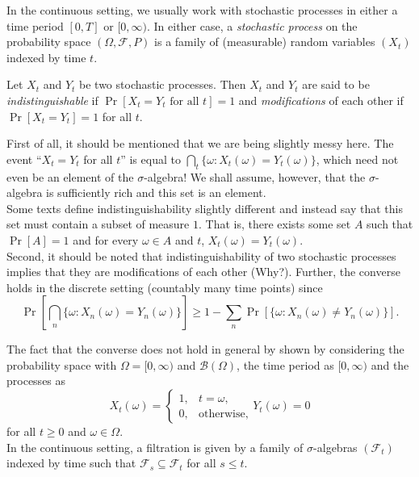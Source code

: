 In the continuous setting, we usually work with stochastic processes in either a time period $[0,T]$ or $[0,\infty)$. In either case, a \textit{stochastic process} on the probability space $(\Omega,\mathcal{F},P)$ is a family of (measurable) random variables $(X_t)$ indexed by time $t$.

\begin{definition}
	\label{def: modification indisting}
	Let $X_t$ and $Y_t$ be two stochastic processes. Then $X_t$ and $Y_t$ are said to be \textit{indistinguishable} if $\Pr[X_t=Y_t\text{ for all }t]=1$ and \textit{modifications} of each other if $\Pr[X_t=Y_t]=1$ for all $t$.
\end{definition}

First of all, it should be mentioned that we are being slightly messy here. The event ``$X_t=Y_t$ for all $t$'' is equal to $\bigcap_t \{\omega : X_t(\omega)=Y_t(\omega)\}$, which need not even be an element of the $\sigma$-algebra! We shall assume, however, that the $\sigma$-algebra is sufficiently rich and this set is an element.\\
Some texts define indistinguishability slightly different and instead say that this set must contain a subset of measure $1$. That is, there exists some set $A$ such that $\Pr[A]=1$ and for every $\omega\in A$ and $t$, $X_t(\omega)=Y_t(\omega)$.\\

Second, it should be noted that indistinguishability of two stochastic processes implies that they are modifications of each other (Why?). Further, the converse holds in the discrete setting (countably many time points) since
\[ \Pr\left[\bigcap_n \{\omega : X_n(\omega)=Y_n(\omega)\}\right] \geq 1 - \sum_{n} \Pr\left[\{\omega : X_n(\omega)\neq Y_n(\omega)\}\right]. \]

The fact that the converse does not hold in general by shown by considering the probability space with $\Omega = [0,\infty)$ and $\mathcal{B}(\Omega)$, the time period as $[0,\infty)$ and the processes as
\[
	X_t(\omega) = 
	\begin{cases}
		1, & t=\omega, \\
		0, & \text{otherwise},
	\end{cases}
	Y_t(\omega) = 0
\]
for all $t\geq 0$ and $\omega\in\Omega$.\\

In the continuous setting, a filtration is given by a family of $\sigma$-algebras $(\mathcal{F}_t)$ indexed by time such that $\mathcal{F}_s \subseteq \mathcal{F}_t$ for all $s\leq t$.


